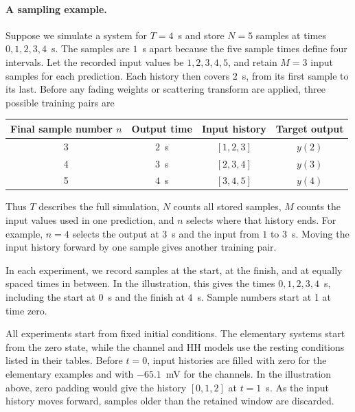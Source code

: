 \begin{samepage}
\paragraph{A sampling example.}
Suppose we simulate a system for \(T=4\)~s and store \(N=5\) samples at times \(0,1,2,3,4\)~s. The samples are \(1\)~s apart because the five sample times define four intervals. Let the recorded input values be \(1,2,3,4,5\), and retain \(M=3\) input samples for each prediction. Each history then covers \(2\)~s, from its first sample to its last. Before any fading weights or scattering transform are applied, three possible training pairs are
\begin{center}
\small
\begin{tabular}{@{}cccc@{}}
\toprule
Final sample number \(n\) & Output time & Input history & Target output \\
\midrule
3 & \(2\)~s & \([1,2,3]\) & \(y(2)\) \\
4 & \(3\)~s & \([2,3,4]\) & \(y(3)\) \\
5 & \(4\)~s & \([3,4,5]\) & \(y(4)\) \\
\bottomrule
\end{tabular}
\end{center}
Thus \(T\) describes the full simulation, \(N\) counts all stored samples, \(M\) counts the input values used in one prediction, and \(n\) selects where that history ends. For example, \(n=4\) selects the output at \(3\)~s and the input from \(1\) to \(3\)~s. Moving the input history forward by one sample gives another training pair.
\end{samepage}

In each experiment, we record samples at the start, at the finish, and at equally spaced times in between. In the illustration, this gives the times \(0,1,2,3,4\)~s, including the start at \(0\)~s and the finish at \(4\)~s. Sample numbers start at 1 at time zero.

All experiments start from fixed initial conditions. The elementary systems start from the zero state, while the channel and HH models use the resting conditions listed in their tables. Before \(t=0\), input histories are filled with zero for the elementary examples and with \(-65.1\)~mV for the channels. In the illustration above, zero padding would give the history \([0,1,2]\) at \(t=1\)~s. As the input history moves forward, samples older than the retained window are discarded.
\endgroup

